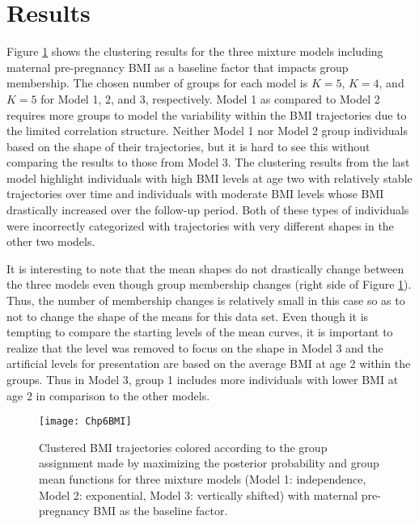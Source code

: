 \section{Results}
Figure \ref{fig:6-1} shows the clustering results for the three mixture models including maternal pre-pregnancy BMI as a baseline factor that impacts group membership. The chosen number of groups for each model is $K = 5$, $K=4$, and $K=5$ for Model 1, 2, and 3, respectively. Model 1 as compared to Model 2 requires more groups to model the variability within the BMI trajectories due to the limited correlation structure. Neither Model 1 nor Model 2 group individuals based on the shape of their trajectories, but it is hard to see this without comparing the results to those from Model 3. The clustering results from the last model highlight individuals with high BMI levels at age two with relatively stable trajectories over time and individuals with moderate BMI levels whose BMI drastically increased over the follow-up period. Both of these types of individuals were incorrectly categorized with trajectories with very different shapes in the other two models.

It is interesting to note that the mean shapes do not drastically change between the three models even though group membership changes (right side of Figure \ref{fig:6-1}). Thus, the number of membership changes is relatively small in this case so as to not to change the shape of the means for this data set. Even though it is tempting to compare the starting levels of the mean curves, it is important to realize that the level was removed to focus on the shape in Model 3 and the artificial levels for presentation are based on the average BMI at age 2 within the groups. Thus in Model 3, group 1 includes more individuals with lower BMI at age 2 in comparison to the other models. 

\begin{figure}[ht]
\centering
\texttt{[image: Chp6BMI]}
\caption{Clustered BMI trajectories colored according to the group assignment made by maximizing the posterior probability and group mean functions for three mixture models (Model 1: independence, Model 2: exponential, Model 3: vertically shifted) with maternal pre-pregnancy BMI as the baseline factor.}
\label{fig:6-1}
\end{figure}

